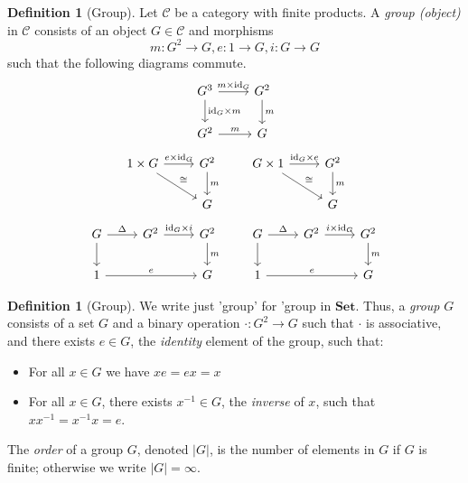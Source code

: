 \documentclass{book}
\theoremstyle{definition}
\newtheorem{df}[prop]{Definition}
\newcommand{\id}[1]{\ensuremath{\mathrm{id}_{#1}}}
\newcommand{\inv}[1]{\ensuremath{{#1}^{-1}}}
\newcommand{\Set}{\ensuremath{\mathbf{Set}}}
\begin{document}
\begin{df}[Group]
Let $\mathcal{C}$ be a category with finite products. A \emph{group (object)} in $\mathcal{C}$ consists of an object $G \in \mathcal{C}$ and morphisms
\[ m : G^2 \rightarrow G, e : 1 \rightarrow G, i : G \rightarrow G \]
such that the following diagrams commute.
\[ \begin{tikzcd}
G^3 \arrow[r,"m \times \id{G}"] \arrow[d,"\id{G} \times m"] & G^2 \arrow[d,"m"] \\
G^2 \arrow[r,"m"] & G
\end{tikzcd} \]
\[ \begin{tikzcd}
1 \times G \arrow[r,"e \times \id{G}"] \arrow[dr,"\cong"] & G^2 \arrow[d,"m"] \\
& G
\end{tikzcd}
\qquad
\begin{tikzcd}
G \times 1 \arrow[r,"\id{G} \times e"] \arrow[dr,"\cong"] & G^2 \arrow[d,"m"] \\
& G
\end{tikzcd} \]
\[ \begin{tikzcd}
G \arrow[r,"\Delta"] \arrow[d] & G^2 \arrow[r,"\id{G} \times i"] & G^2 \arrow[d,"m"] \\
1 \arrow[rr,"e"] & & G
\end{tikzcd}
\qquad
\begin{tikzcd}
G \arrow[r,"\Delta"] \arrow[d] & G^2 \arrow[r,"i \times \id{G}"] & G^2 \arrow[d,"m"] \\
1 \arrow[rr,"e"] & & G
\end{tikzcd} \]
\end{df}

\begin{df}[Group]
We write just 'group' for 'group in $\Set$. Thus, a \emph{group} $G$ consists of a set $G$ and a binary operation $\cdot : G^2 \rightarrow G$ such that $\cdot$ is associative, and there exists $e \in G$, the \emph{identity} element of the group, such that:
    \begin{itemize}
        \item For all $x \in G$ we have $xe = ex = x$
        \item For all $x \in G$, there exists $\inv{x} \in G$, the \emph{inverse} of $x$,
              such that $x \inv{x} = \inv{x} x = e$.
    \end{itemize}

    The \emph{order} of a group $G$, denoted $|G|$, is the number of elements in
    $G$ if $G$ is finite; otherwise we write $|G| = \infty$.
\end{df}
\end{document}
